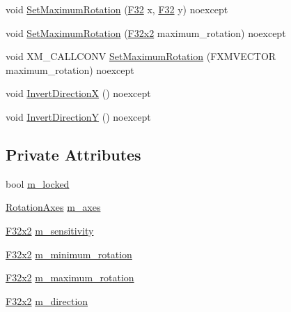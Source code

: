 \begin{DoxyCompactItemize}
\item 
void \hyperlink{classmage_1_1script_1_1_mouse_look_script_a50c3ddaad18713509394d168cddc8aa8}{Set\+Maximum\+Rotation} (\hyperlink{namespacemage_aa97e833b45f06d60a0a9c4fc22ae02c0}{F32} x, \hyperlink{namespacemage_aa97e833b45f06d60a0a9c4fc22ae02c0}{F32} y) noexcept
\item 
void \hyperlink{classmage_1_1script_1_1_mouse_look_script_a878f1268e16f0af89d177fd026b18253}{Set\+Maximum\+Rotation} (\hyperlink{namespacemage_aa87237ad091f5cd7da612b8523fc108f}{F32x2} maximum\+\_\+rotation) noexcept
\item 
void X\+M\+\_\+\+C\+A\+L\+L\+C\+O\+NV \hyperlink{classmage_1_1script_1_1_mouse_look_script_a263e143e671ef56c04132b5e58d114a9}{Set\+Maximum\+Rotation} (F\+X\+M\+V\+E\+C\+T\+OR maximum\+\_\+rotation) noexcept
\item 
void \hyperlink{classmage_1_1script_1_1_mouse_look_script_aa527806c78873eab652dd6337a75b89f}{Invert\+DirectionX} () noexcept
\item 
void \hyperlink{classmage_1_1script_1_1_mouse_look_script_a189145ae96f56b805fe2020ed75db0bc}{Invert\+DirectionY} () noexcept
\end{DoxyCompactItemize}
\subsection*{Private Attributes}
\begin{DoxyCompactItemize}
\item 
bool \hyperlink{classmage_1_1script_1_1_mouse_look_script_addf0b7af4f51cdd521c38d59233c04ce}{m\+\_\+locked}
\item 
\hyperlink{classmage_1_1script_1_1_mouse_look_script_a662018db64c5dc84a958eb1c6123a829}{Rotation\+Axes} \hyperlink{classmage_1_1script_1_1_mouse_look_script_ae41f05d545c70cd621a405f6ef0cd4d5}{m\+\_\+axes}
\item 
\hyperlink{namespacemage_aa87237ad091f5cd7da612b8523fc108f}{F32x2} \hyperlink{classmage_1_1script_1_1_mouse_look_script_afe7a443c1fa56fc6143555f992458934}{m\+\_\+sensitivity}
\item 
\hyperlink{namespacemage_aa87237ad091f5cd7da612b8523fc108f}{F32x2} \hyperlink{classmage_1_1script_1_1_mouse_look_script_a4379e58bd89eab39d3e281133968a959}{m\+\_\+minimum\+\_\+rotation}
\item 
\hyperlink{namespacemage_aa87237ad091f5cd7da612b8523fc108f}{F32x2} \hyperlink{classmage_1_1script_1_1_mouse_look_script_ac3c7af839d88b3d9ec65250c41099c34}{m\+\_\+maximum\+\_\+rotation}
\item 
\hyperlink{namespacemage_aa87237ad091f5cd7da612b8523fc108f}{F32x2} \hyperlink{classmage_1_1script_1_1_mouse_look_script_a5f65024afe8940ca2709d5ee13dc033c}{m\+\_\+direction}
\end{DoxyCompactItemize}
